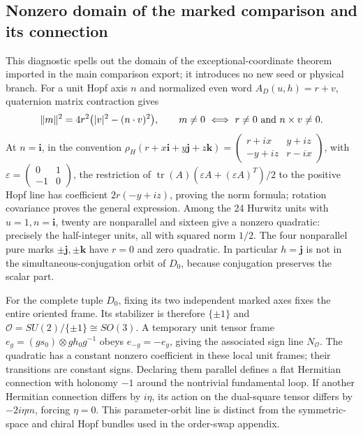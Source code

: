 \documentclass[12pt,a4paper]{article}
\begin{document}
\subsection{Nonzero domain of the marked comparison and its connection}
\label{p2c:app:marked-comparison-domain}
This diagnostic spells out the domain of the exceptional-coordinate theorem imported in
the main comparison export; it introduces no new seed or physical branch.
For a unit Hopf axis $n$ and normalized even word $A_D(u,h)=r+v$,
quaternion matrix contraction gives
\[
 \|m\|^2=4r^2\bigl(|v|^2-(n\cdot v)^2\bigr),\qquad
 m\ne0\ \Longleftrightarrow\ r\ne0\ \hbox{and}\ n\times v\ne0.
\]
At $n=\mathbf i$, in the convention
$\rho_H(r+x\mathbf i+y\mathbf j+z\mathbf k)
=\left(\begin{smallmatrix}r+ix&y+iz\\-y+iz&r-ix\end{smallmatrix}\right)$,
with $\varepsilon=\left(\begin{smallmatrix}0&1\\-1&0\end{smallmatrix}\right)$,
the restriction of
$\operatorname{tr}(A)(\varepsilon A+(\varepsilon A)^T)/2$ to the positive
Hopf line has coefficient $2r(-y+iz)$, proving the norm formula; rotation
covariance proves the general expression.
Among the 24 Hurwitz units with $u=1,n=\mathbf i$, twenty are nonparallel
and sixteen give a nonzero quadratic: precisely the half-integer units,
all with squared norm $1/2$. The four nonparallel pure marks
$\pm\mathbf j,\pm\mathbf k$ have $r=0$ and zero quadratic. In particular
$h=\mathbf j$ is not in the simultaneous-conjugation orbit of $D_0$,
because conjugation preserves the scalar part.

For the complete tuple $D_0$, fixing its two independent marked axes fixes
the entire oriented frame. Its stabilizer is therefore $\{\pm1\}$ and
$\mathcal O=SU(2)/\{\pm1\}\cong SO(3)$. A temporary unit tensor frame
$e_g=(gs_0)\otimes gh_0g^{-1}$ obeys $e_{-g}=-e_g$, giving the associated
sign line $N_{\mathcal O}$. The quadratic has a constant nonzero coefficient
in these local unit frames; their transitions are constant signs. Declaring
them parallel defines a flat Hermitian connection with holonomy $-1$ around
the nontrivial fundamental loop. If another Hermitian connection differs
by $i\eta$, its action on the dual-square tensor differs by $-2i\eta m$,
forcing $\eta=0$. This parameter-orbit line is distinct from the
symmetric-space and chiral Hopf bundles used in the order-swap appendix.
\end{document}
